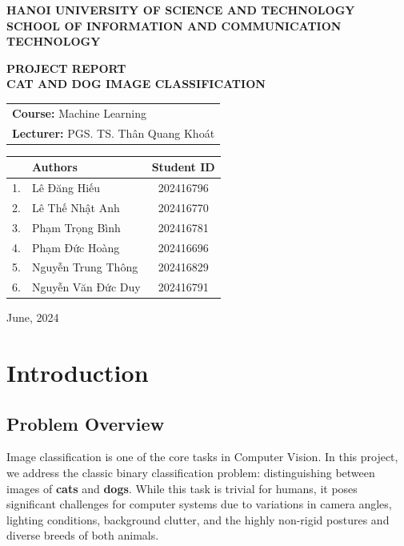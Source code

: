 \documentclass[12pt,a4paper]{article}
\begin{document}
\begin{titlepage}
\begin{center}
    {\large \textbf{HANOI UNIVERSITY OF SCIENCE AND TECHNOLOGY}} \\
    {\large \textbf{SCHOOL OF INFORMATION AND COMMUNICATION TECHNOLOGY}} \\
    \vskip 2.5cm
    
    {\Huge \textbf{PROJECT REPORT}} \\
    \vskip 0.5cm
    {\Large \textbf{CAT AND DOG IMAGE CLASSIFICATION}} \\
    
    \vskip 2.5cm
    \begin{tabular}{l}
        \textbf{Course:} Machine Learning \\
        \textbf{Lecturer:} PGS. TS. Thân Quang Khoát
    \end{tabular}
    
    \vskip 2.5cm
    \begin{tabular}{llc}
        \toprule
        & \textbf{Authors} & \textbf{Student ID} \\
        \midrule
        1. & Lê Đăng Hiếu & 202416796 \\
        2. & Lê Thế Nhật Anh & 202416770 \\
        3. & Phạm Trọng Bình & 202416781 \\
        4. & Phạm Đức Hoàng & 202416696 \\
        5. & Nguyễn Trung Thông & 202416829 \\
        6. & Nguyễn Văn Đức Duy & 202416791 \\
        \bottomrule
    \end{tabular}
    
    \vfill
    {\large June, 2024}
\end{center}
\end{titlepage}

\tableofcontents
\newpage

\section{Introduction}

\subsection{Problem Overview}
Image classification is one of the core tasks in Computer Vision. In this project, we address the classic binary classification problem: distinguishing between images of \textbf{cats} and \textbf{dogs}. While this task is trivial for humans, it poses significant challenges for computer systems due to variations in camera angles, lighting conditions, background clutter, and the highly non-rigid postures and diverse breeds of both animals.
\end{document}
